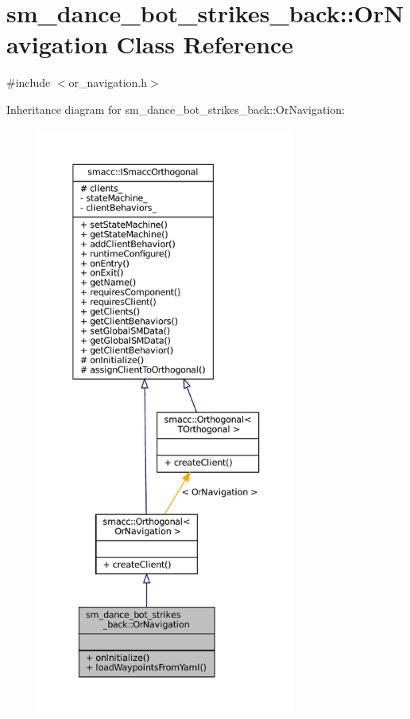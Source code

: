 \hypertarget{classsm__dance__bot__strikes__back_1_1OrNavigation}{}\section{sm\+\_\+dance\+\_\+bot\+\_\+strikes\+\_\+back\+:\+:Or\+Navigation Class Reference}
\label{classsm__dance__bot__strikes__back_1_1OrNavigation}


{\ttfamily \#include $<$or\+\_\+navigation.\+h$>$}



Inheritance diagram for sm\+\_\+dance\+\_\+bot\+\_\+strikes\+\_\+back\+:\+:Or\+Navigation\+:
\nopagebreak
\begin{figure}[H]
\begin{center}
\leavevmode
\includegraphics[height=550pt]{classsm__dance__bot__strikes__back_1_1OrNavigation__inherit__graph}
\end{center}
\end{figure}


